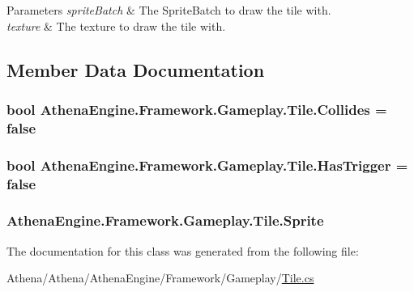 \begin{DoxyParams}{Parameters}
{\em sprite\-Batch} & The Sprite\-Batch to draw the tile with.\\
\hline
{\em texture} & The texture to draw the tile with.\\
\hline
\end{DoxyParams}


\subsection{Member Data Documentation}
\hypertarget{class_athena_engine_1_1_framework_1_1_gameplay_1_1_tile_aaa1943b0ddb6d4371980934b0d931ef7}{
\subsubsection[{Collides}]{\setlength{\rightskip}{0pt plus 5cm}bool Athena\-Engine.\-Framework.\-Gameplay.\-Tile.\-Collides = false}}\label{class_athena_engine_1_1_framework_1_1_gameplay_1_1_tile_aaa1943b0ddb6d4371980934b0d931ef7}
\hypertarget{class_athena_engine_1_1_framework_1_1_gameplay_1_1_tile_a4265d7725c1393ad8eaa17b4e8b5ff05}{
\subsubsection[{Has\-Trigger}]{\setlength{\rightskip}{0pt plus 5cm}bool Athena\-Engine.\-Framework.\-Gameplay.\-Tile.\-Has\-Trigger = false}}\label{class_athena_engine_1_1_framework_1_1_gameplay_1_1_tile_a4265d7725c1393ad8eaa17b4e8b5ff05}
\hypertarget{class_athena_engine_1_1_framework_1_1_gameplay_1_1_tile_aa98f08e02a32fdcc3455d297baa1a5fd}{
\subsubsection[{Sprite}]{ Athena\-Engine.\-Framework.\-Gameplay.\-Tile.\-Sprite}}\label{class_athena_engine_1_1_framework_1_1_gameplay_1_1_tile_aa98f08e02a32fdcc3455d297baa1a5fd}


The documentation for this class was generated from the following file\-:\begin{DoxyCompactItemize}
\item 
Athena/\-Athena/\-Athena\-Engine/\-Framework/\-Gameplay/\hyperlink{_tile_8cs}{Tile.\-cs}\end{DoxyCompactItemize}
